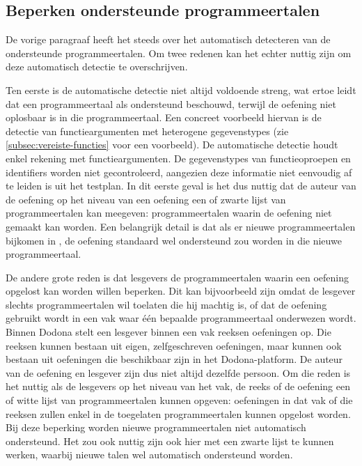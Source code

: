 \subsection{Beperken ondersteunde programmeertalen}\label{subsec:beperken-beschikbare-programmeertalen}

De vorige paragraaf heeft het steeds over het automatisch detecteren van de ondersteunde programmeertalen.
Om twee redenen kan het echter nuttig zijn om deze automatisch detectie te overschrijven.

Ten eerste is de automatische detectie niet altijd voldoende streng, wat ertoe leidt dat \tested{} een programmeertaal als ondersteund beschouwd, terwijl de oefening niet oplosbaar is in die programmeertaal.
Een concreet voorbeeld hiervan is de detectie van functieargumenten met heterogene gegevenstypes (zie \cref{subsec:vereiste-functies} voor een voorbeeld).
De automatische detectie houdt enkel rekening met  functieargumenten.
De gegevenstypes van functieoproepen en identifiers worden niet gecontroleerd, aangezien deze informatie niet eenvoudig af te leiden is uit het testplan.
In dit eerste geval is het dus nuttig dat de auteur van de oefening op het niveau van een oefening een  of zwarte lijst van programmeertalen kan meegeven: programmeertalen waarin de oefening niet gemaakt kan worden.
Een belangrijk detail is dat als er nieuwe programmeertalen bijkomen in \tested{}, de oefening standaard wel ondersteund zou worden in die nieuwe programmeertaal.

De andere grote reden is dat lesgevers de programmeertalen waarin een oefening opgelost kan worden willen beperken.
Dit kan bijvoorbeeld zijn omdat de lesgever slechts programmeertalen wil toelaten die hij machtig is, of dat de oefening gebruikt wordt in een vak waar één bepaalde programmeertaal onderwezen wordt.
Binnen Dodona stelt een lesgever binnen een vak reeksen oefeningen op.
Die reeksen kunnen bestaan uit eigen, zelfgeschreven oefeningen, maar kunnen ook bestaan uit oefeningen die beschikbaar zijn in het Dodona-platform.
De auteur van de oefening en lesgever zijn dus niet altijd dezelfde persoon.
Om die reden is het nuttig als de lesgevers op het niveau van het vak, de reeks of de oefening een  of witte lijst van programmeertalen kunnen opgeven: oefeningen in dat vak of die reeksen zullen enkel in de toegelaten programmeertalen kunnen opgelost worden.
Bij deze beperking worden nieuwe programmeertalen niet automatisch ondersteund.
Het zou ook nuttig zijn ook hier met een zwarte lijst te kunnen werken, waarbij nieuwe talen wel automatisch ondersteund worden.

